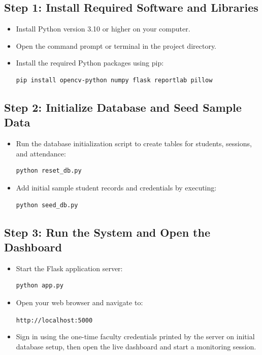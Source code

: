 \documentclass[10pt]{report}
\begin{document}
\subsection{Step 1: Install Required Software and Libraries}
\begin{itemize}
    \item Install Python version 3.10 or higher on your computer.
    \item Open the command prompt or terminal in the project directory.
    \item Install the required Python packages using pip:
    \begin{lstlisting}[language=bash]
    pip install opencv-python numpy flask reportlab pillow
    \end{lstlisting}
\end{itemize}

\subsection{Step 2: Initialize Database and Seed Sample Data}
\begin{itemize}
    \item Run the database initialization script to create tables for students, sessions, and attendance:
    \begin{lstlisting}[language=bash]
    python reset_db.py
    \end{lstlisting}
    \item Add initial sample student records and credentials by executing:
    \begin{lstlisting}[language=bash]
    python seed_db.py
    \end{lstlisting}
\end{itemize}

\subsection{Step 3: Run the System and Open the Dashboard}
\begin{itemize}
    \item Start the Flask application server:
    \begin{lstlisting}[language=bash]
    python app.py
    \end{lstlisting}
    \item Open your web browser and navigate to:
    \begin{center}
    \texttt{http://localhost:5000}
    \end{center}
    \item Sign in using the one-time faculty credentials printed by the server on initial database setup, then open the live dashboard and start a monitoring session.
\end{itemize}
\end{document}
